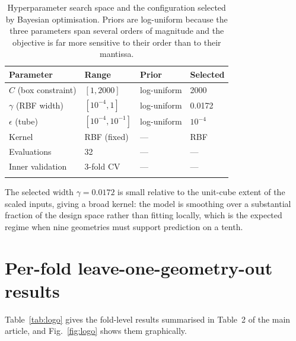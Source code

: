 \documentclass[pdflatex,sn-basic,Numbered]{sn-jnl}
\begin{document}
\begin{table}[h]
\caption{Hyperparameter search space and the configuration selected by Bayesian
optimisation. Priors are log-uniform because the three parameters span several
orders of magnitude and the objective is far more sensitive to their order than
to their mantissa.}\label{tab:searchspace}
\begin{tabular*}{\textwidth}{@{\extracolsep\fill}llll}
\toprule
Parameter & Range & Prior & Selected \\
\midrule
$C$ (box constraint)  & $[1, 2000]$          & log-uniform & 2000 \\
$\gamma$ (RBF width)  & $[10^{-4}, 1]$       & log-uniform & 0.0172 \\
$\epsilon$ (tube)     & $[10^{-4}, 10^{-1}]$ & log-uniform & $10^{-4}$ \\
Kernel                & RBF (fixed)          & ---         & RBF \\
\midrule
Evaluations           & 32                   & ---         & --- \\
Inner validation      & 3-fold CV            & ---         & --- \\
\botrule
\end{tabular*}
\end{table}

The selected width $\gamma = 0.0172$ is small relative to the unit-cube extent
of the scaled inputs, giving a broad kernel: the model is smoothing over a
substantial fraction of the design space rather than fitting locally, which is
the expected regime when nine geometries must support prediction on a tenth.

\section{Per-fold leave-one-geometry-out results}\label{sup:logo}

Table~\ref{tab:logo} gives the fold-level results summarised in Table~2 of the
main article, and Fig.~\ref{fig:logo} shows them graphically.
\end{document}
